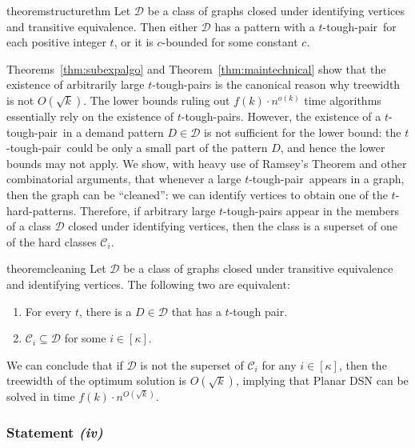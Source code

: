 \documentclass[a4paper,11pt]{article}
\newcommand{\calD}{\mathcal{D}}
\theoremstyle{plain}
\newtheorem{identification rule}{Identification Rule}
\theoremstyle{definition}
\theoremstyle{remark}
\newcommand{\dsn}{{\sc Planar DSN}\xspace}
\newcommand{\toughpair}{tough-pair}
\begin{document}
  \begin{restatable}{theorem}{structurethm}\label{thm:maintechnical}
Let $\calD$ be a class of graphs closed under identifying vertices and transitive equivalence. Then either $\calD$ has a pattern with a $t$-\toughpair\ for each positive integer $t$, or it is $c$-bounded for some constant $c$.
\end{restatable}
  
Theorems~\ref{thm:subexpalgo} and Theorem~\ref{thm:maintechnical} show that the existence of arbitrarily large $t$-tough-pairs is the canonical reason why treewidth is not $O(\sqrt{k})$. The lower bounds ruling out $f(k) \cdot n^{o(k)}$ time algorithms essentially rely on the existence of $t$-tough-pairs. However, the existence of a $t$-\toughpair\ in a demand pattern $D\in \calD$ is not sufficient for the lower bound: the $t$-\toughpair\ could be only a small part of the pattern $D$, and hence the lower bounds may not apply. We show, with heavy use of Ramsey's Theorem and other combinatorial arguments, that whenever a large $t$-\toughpair\ appears in a graph, then the graph can be ``cleaned'': we can identify vertices to obtain one of the $t$-hard-patterns. 
  Therefore, if arbitrary large $t$-tough-pairs appear in the members of a class $\calD$ closed under identifying vertices, then the class is a superset of one of the hard classes $\mathcal{C}_i$.

 \begin{restatable}{theorem}{cleaning}\label{thm:cleaning-intro}
   Let $\calD$ be a class of graphs closed under transitive equivalence and identifying vertices. The following two are equivalent:
    \begin{enumerate}
    \item For every $t$, there is a $D\in\calD$ that has a $t$-tough pair.
      \item $\mathcal{C}_i\subseteq \calD$ for some $i\in[\kappa]$.
    \end{enumerate}
\end{restatable}

  We can conclude that if $\calD$ is not the superset of $\mathcal{C}_i$ for any $i\in [\kappa]$, then the treewidth of the optimum solution is $O(\sqrt{k})$, implying that \dsn can be solved in time $f(k) \cdot n^{O(\sqrt{k})}$. 

\subsubsection*{Statement \textit{(iv)}}
\end{document}
